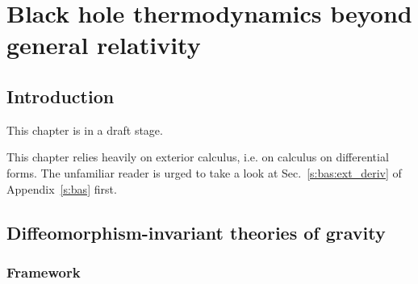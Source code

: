 \chapter{Black hole thermodynamics beyond general relativity}
\label{s:tha}

\minitoc

\section{Introduction}

This chapter is in a draft stage.

\medskip

This chapter relies heavily on exterior calculus, i.e. on calculus on differential forms.
The unfamiliar reader is urged to take a look at Sec.~\ref{s:bas:ext_deriv} of
Appendix~\ref{s:bas} first.

\section{Diffeomorphism-invariant theories of gravity}

\subsection{Framework} \label{s:tha:framework}

